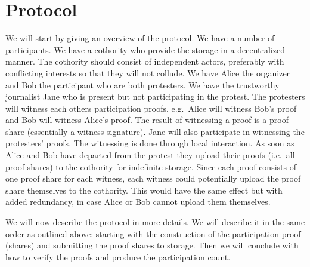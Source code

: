 \section{Protocol}

We will start by giving an overview of the protocol.
We have a number of participants.
We have a cothority who provide the storage in a decentralized manner.
The cothority should consist of independent actors, preferably with conflicting 
interests so that they will not collude.
We have Alice the organizer and Bob the participant who are both protesters.
We have the trustworthy journalist Jane who is present but not participating in 
the protest.
The protesters will witness each others participation proofs, e.g.\ Alice will 
witness Bob's proof and Bob will witness Alice's proof.
The result of witnessing a proof is a proof share (essentially a witness 
signature).
Jane will also participate in witnessing the protesters' proofs.
The witnessing is done through local interaction.
As soon as Alice and Bob have departed from the protest they upload their proofs 
(i.e.\ all proof shares) to the cothority for indefinite storage.
Since each proof consists of one proof share for each witness, each witness 
could potentially upload the proof share themselves to the cothority.
This would have the same effect but with added redundancy, in case Alice or Bob 
cannot upload them themselves.

We will now describe the protocol in more details.
We will describe it in the same order as outlined above:
starting with the construction of the participation proof (shares) and 
submitting the proof shares to storage.
Then we will conclude with how to verify the proofs and produce the 
participation count.

